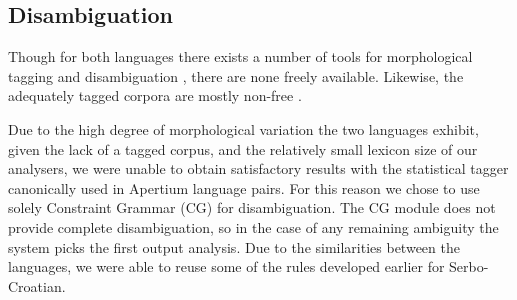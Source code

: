 \subsection{Disambiguation}
Though for both languages there exists a number of tools for
morphological tagging and disambiguation \cite{vitas2004intex,agic2008improving,snajder08automatic,peradin2012towards}, there
are none freely available. Likewise, the adequately tagged corpora are
mostly non-free \cite{erjavec2004multext,tadic2002building}.

Due to the high degree of morphological variation the two languages
exhibit, given the lack of a tagged corpus, and the relatively small
lexicon size of our analysers, we were unable to obtain satisfactory
results with the statistical tagger canonically used in Apertium
language pairs.
For this reason we chose to use solely
Constraint Grammar (CG) for disambiguation. The CG module does not
provide complete disambiguation, so in the case of any remaining
ambiguity the system picks the first output analysis.
Due to the similarities between the languages, we were able to
reuse some of the rules developed earlier for Serbo-Croatian.




